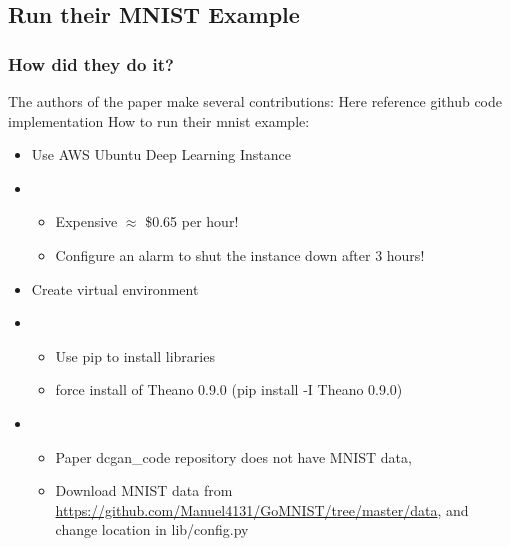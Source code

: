 \documentclass{beamer}
\begin{document}
\subsection{Run their MNIST Example}
\begin{frame}
\frametitle{How did they do it?}
The authors of the paper make several contributions:
Here reference github code implementation
How to run their mnist example:
\begin{itemize}
  \item Use AWS Ubuntu Deep Learning Instance
  \item \begin{itemize}
    \item Expensive $\approx$ \$0.65 per hour!
    \item Configure an alarm to shut the instance down after 3 hours!
    \end{itemize}
 \item Create virtual environment
 \item \begin{itemize}
    \item Use pip to install libraries
    \item force install of Theano 0.9.0 (pip install -I Theano 0.9.0)
    \end{itemize} 
 \item \begin{itemize}
    \item Paper dcgan\_code repository does not have MNIST data,
    \item Download MNIST data from \url{https://github.com/Manuel4131/GoMNIST/tree/master/data}, and change location in lib/config.py
    \end{itemize}
 \end{itemize}
\end{frame}

\end{document}
